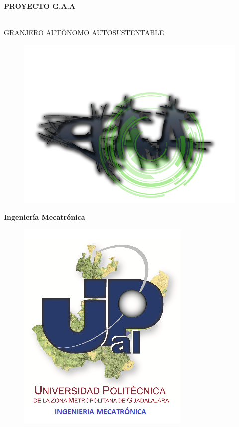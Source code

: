 \documentclass[11pt,a4paper]{article}
\author{Miguel Angel Xamie Diaz Fuentes}
\begin{document}
\begin{center}
\begin{LARGE}
\textbf{PROYECTO G.A.A}
\end{LARGE}
\\
GRANJERO AUTÓNOMO AUTOSUSTENTABLE\\

\begin{figure}[hbtp]
\centering
\includegraphics[scale=0.30]{Pictures/LOGO.png}
\end{figure}
\textbf{{\Large Ingeniería Mecatrónica}}\\
\begin{figure}[hbtp]
\centering
\includegraphics[scale=0.50]{Pictures/UPZMG_Mecatr_nica.png}
\end{figure} 



\end{center}
\end{document}
